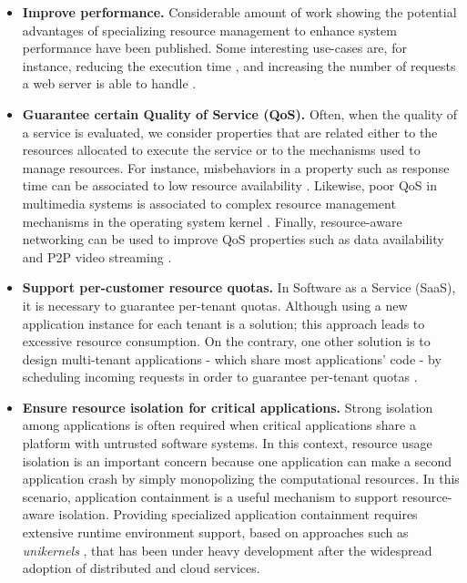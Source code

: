 \begin{itemize}
\item \textbf{Improve performance.}
Considerable amount of work showing the potential advantages of specializing resource management to enhance system performance have been published.
Some interesting use-cases are, for instance, reducing the execution time \cite{Polo:2011:RAS:2414338.2414352}, and increasing the number of requests a web server is able to handle \cite{engler1995exokernel,Belay:2014:IPD:2685048.2685053}.

\item \textbf{Guarantee certain Quality of Service (QoS).} 
Often, when the quality of a service is evaluated, we consider properties that are related either to the resources allocated to execute the service or to the mechanisms used to manage resources.
For instance, misbehaviors in a property such as response time can be associated to low resource availability \cite{Chechik-2009,autili2012hybrid}.
Likewise, poor QoS in multimedia systems is associated to complex resource management mechanisms in the operating system kernel \cite{Black1997}.
Finally, resource-aware networking can be used to improve QoS properties such as data availability \cite{Boldrini:2008:CRA:1549824.1550106} and P2P video streaming \cite{Pianese:2007:RLA:1326320.1326323,Alhaisoni:2010:RTO:1664767.1664770}.

\item \textbf{Support per-customer resource quotas.}
In Software as a Service (SaaS), it is necessary to guarantee per-tenant quotas.
Although using a new application instance for each tenant is a solution; this approach leads to excessive resource consumption.
On the contrary, one other solution is to design multi-tenant applications - which share most applications' code - by scheduling incoming requests in order to guarantee per-tenant quotas \cite{KrSpAhKo2014_CCGrid_ResourceIsolation,KrWeKo2013-icwe-MTBenchmark}.    

\item \textbf{Ensure resource isolation for critical applications.}
Strong isolation among applications is often required when critical applications \cite{Knight:2002:SCS:581339.581406} share a platform with untrusted software systems.
In this context, resource usage isolation is an important concern because one application can make a second application crash by simply monopolizing the computational resources.
In this scenario, application containment \cite{Kamp00jails:confining,Soltesz:2007:COS:1272998.1273025,Madhavapeddy:2015:JJS:2789770.2789809} is a useful mechanism to support resource-aware isolation.
Providing specialized application containment requires extensive runtime environment support, based on approaches such as \textit{unikernels} \cite{Madhavapeddy:2013:ULO:2499368.2451167, Kivity:2014:OVO:2643634.2643642, Madhavapeddy:2015:JJS:2789770.2789809}, that has been under heavy development after the widespread adoption of distributed and cloud services.  

\end{itemize}

